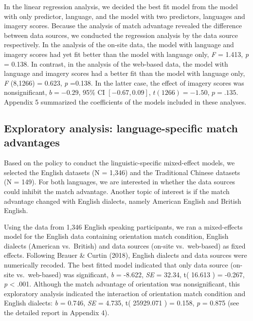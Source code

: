 \documentclass[
  man]{apa6}
\begin{document}
In the linear regression analysis, we decided the best fit model from the model with only predictor, language, and the model with two predictors, languages and imagery scores. Because the analysis of match advantage revealed the difference between data sources, we conducted the regression analysis by the data source respectively. In the analysis of the on-site data, the model with language and imagery scores had yet fit better than the model with language only, \emph{F} = 1.413, \emph{p} = 0.138. In contrast, in the analysis of the web-based data, the model with language and imagery scores had a better fit than the model with language only, \emph{F} (8,1266) = 0.623, \emph{p} =0.138. In the latter case, the effect of imagery scores was nonsignificant, \(b = -0.29\), 95\% CI \([-0.67, 0.09]\), \(t(1266) = -1.50\), \(p = .135\). Appendix 5 summarized the coefficients of the models included in these analyses.

\hypertarget{exploratory-analysis-language-specific-match-advantages}{%
\subsection{Exploratory analysis: language-specific match advantages}\label{exploratory-analysis-language-specific-match-advantages}}

Based on the policy to conduct the linguistic-specific mixed-effect models, we selected the English datasets (N = 1,346) and the Traditional Chinese datasets (N = 149). For both languages, we are interested in whether the data sources could inhibit the match advantage. Another topic of interest is if the match advantage changed with English dialects, namely American English and British English.

Using the data from 1,346 English speaking participants, we ran a mixed-effects model for the English data containing orientation match condition, English dialects (American vs.~British) and data sources (on-site vs.~web-based) as fixed effects. Following Brauer \& Curtin (2018), English dialects and data sources were numerically recoded. The best fitted model indicated that only data source (on-site vs.~web-based) was significant, \emph{b} = -8.622, \emph{SE} = 32.34, t( 16.613 ) = -0.267, \emph{p} \textless{} .001. Although the match advantage of orientation was nonsignificant, this exploratory analysis indicated the interaction of orientation match condition and English dialects: \emph{b} = 0.746, \emph{SE} = 4.735, t( 25929.071 ) = 0.158, \emph{p} = 0.875 (see the detailed report in Appendix 4).
\end{document}
